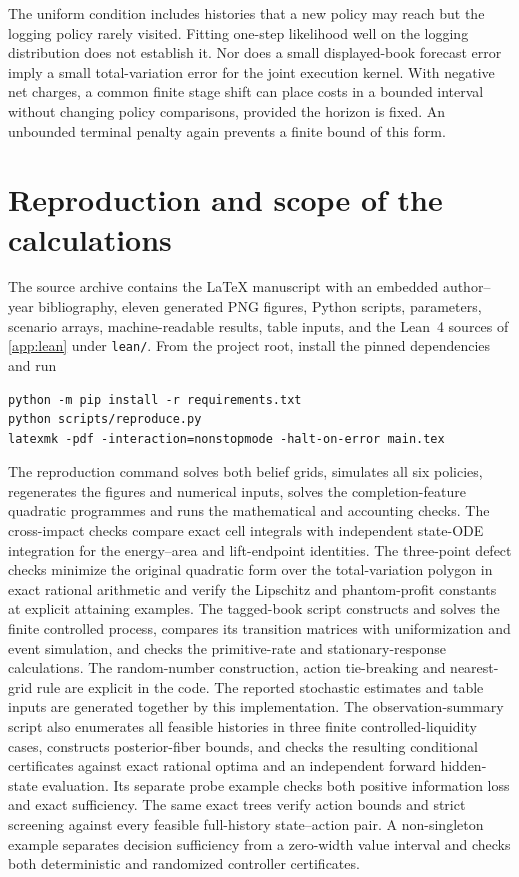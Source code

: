 \documentclass[11pt]{article}
\numberwithin{equation}{section}
\theoremstyle{definition}
\theoremstyle{remark}
\theoremstyle{definition}
\begin{document}
The uniform condition includes histories that a new policy may reach but
the logging policy rarely visited. Fitting one-step likelihood well on the
logging distribution does not establish it. Nor does a small displayed-book
forecast error imply a small total-variation error for the joint execution
kernel. With negative net charges, a common finite stage shift can place
costs in a bounded interval without changing policy comparisons, provided
the horizon is fixed. An unbounded terminal penalty again prevents a finite
bound of this form.

\section{Reproduction and scope of the calculations}\label{app:reproduction}

The source archive contains the LaTeX manuscript with an embedded
author--year bibliography, eleven generated PNG figures, Python scripts,
parameters, scenario arrays, machine-readable results, table inputs, and the
Lean~4 sources of \cref{app:lean} under \texttt{lean/}.
From the project root, install the pinned dependencies and run
\begin{verbatim}
python -m pip install -r requirements.txt
python scripts/reproduce.py
latexmk -pdf -interaction=nonstopmode -halt-on-error main.tex
\end{verbatim}
The reproduction command solves both belief grids, simulates all six policies,
regenerates the figures and numerical inputs, solves the completion-feature
quadratic programmes and runs the mathematical and accounting checks.
The cross-impact checks compare exact cell integrals with independent
state-ODE integration for the energy--area and lift-endpoint identities.
The three-point defect checks minimize the original quadratic form over the
total-variation polygon in exact rational arithmetic and verify the
Lipschitz and phantom-profit constants at explicit attaining examples.
The tagged-book script constructs and solves the finite controlled process,
compares its transition matrices with uniformization and event simulation,
and checks the primitive-rate and stationary-response calculations.
The random-number construction, action tie-breaking and nearest-grid rule are
explicit in the code. The reported stochastic estimates and table inputs
are generated together by this implementation.
The observation-summary script also enumerates all feasible histories in
three finite controlled-liquidity cases, constructs posterior-fiber bounds,
and checks the resulting conditional certificates against exact rational
optima and an independent forward hidden-state evaluation. Its separate
probe example checks both positive information loss and exact sufficiency.
The same exact trees verify action bounds and strict screening against
every feasible full-history state--action pair. A non-singleton example
separates decision sufficiency from a zero-width value interval and checks
both deterministic and randomized controller certificates.
\end{document}
